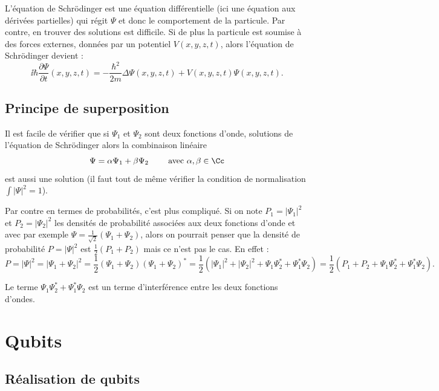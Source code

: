 \documentclass[11pt,class=report,crop=false]{standalone}
\begin{document}
L'équation de Schrödinger est une équation différentielle (ici une équation aux dérivées partielles) qui régit $\Psi$ et donc le comportement de la particule. Par contre, en trouver des solutions est difficile.
Si de plus la particule est soumise à des forces externes, données par un potentiel $V(x,y,z,t)$, alors l'équation de Schrödinger devient :
$$\ii \hbar \frac{\partial \Psi}{\partial t}(x,y,z,t) = - \frac{\hbar^2}{2m} \Delta \Psi(x,y,z,t) + V(x,y,z,t)\Psi(x,y,z,t).$$

\subsection{Principe de superposition}


Il est facile de vérifier que si $\Psi_1$ et $\Psi_2$ sont deux fonctions d'onde, solutions de l'équation de Schrödinger alors la combinaison linéaire 
$$\Psi = \alpha \Psi_1 + \beta \Psi_2 \qquad \text{ avec } \alpha, \beta \in \Cc$$ est aussi une solution (il faut tout de même vérifier la condition de normalisation $\int |\Psi|^2 = 1$).

Par contre en termes de probabilités, c'est plus compliqué. Si on note $P_1 = |\Psi_1|^2$ et $P_2 = |\Psi_2|^2$ les densités de probabilité associées aux deux fonctions d'onde et avec par exemple $\Psi = \frac{1}{\sqrt2} (\Psi_1+\Psi_2)$, 
alors on pourrait penser que la densité de probabilité $P = |\Psi|^2$ est $\frac12(P_1+P_2)$ mais ce n'est pas le cas. En effet :
$$P = |\Psi|^2 = |\Psi_1+\Psi_2|^2 = \frac12(\Psi_1+\Psi_2)(\Psi_1+\Psi_2)^*
= \frac12(|\Psi_1|^2+|\Psi_2|^2 + \Psi_1\Psi_2^* + \Psi_1^*\Psi_2)
= \frac12(P_1+P_2 + \Psi_1\Psi_2^* + \Psi_1^*\Psi_2).$$

Le terme $\Psi_1\Psi_2^* + \Psi_1^*\Psi_2$ est un terme d'interférence entre les deux fonctions d'ondes.


\section{Qubits}

\subsection{Réalisation de qubits}
\end{document}
